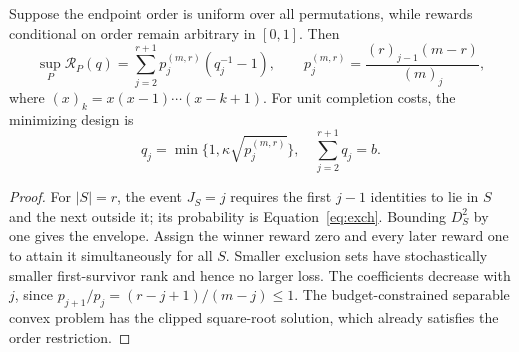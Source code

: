 \documentclass[12pt]{clear2027}
\begin{document}
\begin{theorem}\label{thm:exch}
Suppose the endpoint order is uniform over all permutations, while rewards conditional on order remain arbitrary in $[0,1]$. Then
\begin{equation}
 \sup_P\mathcal R_P(q)=\sum_{j=2}^{r+1}p_j^{(m,r)}(q_j^{-1}-1),\qquad
 p_j^{(m,r)}=\frac{(r)_{j-1}(m-r)}{(m)_j},\label{eq:exch}
\end{equation}
where $(x)_k=x(x-1)\cdots(x-k+1)$. For unit completion costs, the minimizing design is
\begin{equation}
 q_j=\min\{1,\kappa\sqrt{p_j^{(m,r)}}\},\quad
 \sum_{j=2}^{r+1}q_j=b.\label{eq:sqrt}
\end{equation}
\end{theorem}
\begin{proof}
For $|S|=r$, the event $J_S=j$ requires the first $j-1$ identities to lie in $S$ and the next outside it; its probability is Equation~\eqref{eq:exch}. Bounding $D_S^2$ by one gives the envelope. Assign the winner reward zero and every later reward one to attain it simultaneously for all $S$. Smaller exclusion sets have stochastically smaller first-survivor rank and hence no larger loss. The coefficients decrease with $j$, since $p_{j+1}/p_j=(r-j+1)/(m-j)\le1$. The budget-constrained separable convex problem has the clipped square-root solution, which already satisfies the order restriction.
\end{proof}
\end{document}
